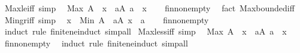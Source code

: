 \begin{isabellebody}
\endisatagproof
{\isafoldproof}%
%
\isadelimproof
\isanewline
%
\endisadelimproof
\isanewline
{}\isamarkupfalse%
\ Max{\isacharunderscore}{\kern0pt}le{\isacharunderscore}{\kern0pt}iff\ {\isacharbrackleft}{\kern0pt}simp{\isacharbrackright}{\kern0pt}{\isacharcolon}{\kern0pt}\isanewline
\ \ {\isachardoublequoteopen}Max\ A\ {\isasymle}\ x\ {\isasymlongleftrightarrow}\ {\isacharparenleft}{\kern0pt}{\isasymforall}a{\isasymin}A{\isachardot}{\kern0pt}\ a\ {\isasymle}\ x{\isacharparenright}{\kern0pt}{\isachardoublequoteclose}\isanewline
%
\isadelimproof
\ \ %
\endisadelimproof
%
\isatagproof
{}\isamarkupfalse%
\ fin{\isacharunderscore}{\kern0pt}nonempty\ \isamarkupfalse%
\ {\isacharparenleft}{\kern0pt}fact\ Max{\isachardot}{\kern0pt}bounded{\isacharunderscore}{\kern0pt}iff{\isacharparenright}{\kern0pt}%
\endisatagproof
{\isafoldproof}%
%
\isadelimproof
\isanewline
%
\endisadelimproof
\isanewline
{}\isamarkupfalse%
\ Min{\isacharunderscore}{\kern0pt}gr{\isacharunderscore}{\kern0pt}iff\ {\isacharbrackleft}{\kern0pt}simp{\isacharbrackright}{\kern0pt}{\isacharcolon}{\kern0pt}\isanewline
\ \ {\isachardoublequoteopen}x\ {\isacharless}{\kern0pt}\ Min\ A\ {\isasymlongleftrightarrow}\ {\isacharparenleft}{\kern0pt}{\isasymforall}a{\isasymin}A{\isachardot}{\kern0pt}\ x\ {\isacharless}{\kern0pt}\ a{\isacharparenright}{\kern0pt}{\isachardoublequoteclose}\isanewline
%
\isadelimproof
\ \ %
\endisadelimproof
%
\isatagproof
{}\isamarkupfalse%
\ fin{\isacharunderscore}{\kern0pt}nonempty\ \ \isamarkupfalse%
\ {\isacharparenleft}{\kern0pt}induct\ rule{\isacharcolon}{\kern0pt}\ finite{\isacharunderscore}{\kern0pt}ne{\isacharunderscore}{\kern0pt}induct{\isacharparenright}{\kern0pt}\ simp{\isacharunderscore}{\kern0pt}all%
\endisatagproof
{\isafoldproof}%
%
\isadelimproof
\isanewline
%
\endisadelimproof
\isanewline
{}\isamarkupfalse%
\ Max{\isacharunderscore}{\kern0pt}less{\isacharunderscore}{\kern0pt}iff\ {\isacharbrackleft}{\kern0pt}simp{\isacharbrackright}{\kern0pt}{\isacharcolon}{\kern0pt}\isanewline
\ \ {\isachardoublequoteopen}Max\ A\ {\isacharless}{\kern0pt}\ x\ {\isasymlongleftrightarrow}\ {\isacharparenleft}{\kern0pt}{\isasymforall}a{\isasymin}A{\isachardot}{\kern0pt}\ a\ {\isacharless}{\kern0pt}\ x{\isacharparenright}{\kern0pt}{\isachardoublequoteclose}\isanewline
%
\isadelimproof
\ \ %
\endisadelimproof
%
\isatagproof
{}\isamarkupfalse%
\ fin{\isacharunderscore}{\kern0pt}nonempty\ \isamarkupfalse%
\ {\isacharparenleft}{\kern0pt}induct\ rule{\isacharcolon}{\kern0pt}\ finite{\isacharunderscore}{\kern0pt}ne{\isacharunderscore}{\kern0pt}induct{\isacharparenright}{\kern0pt}\ simp{\isacharunderscore}{\kern0pt}all%

\end{isabellebody}
